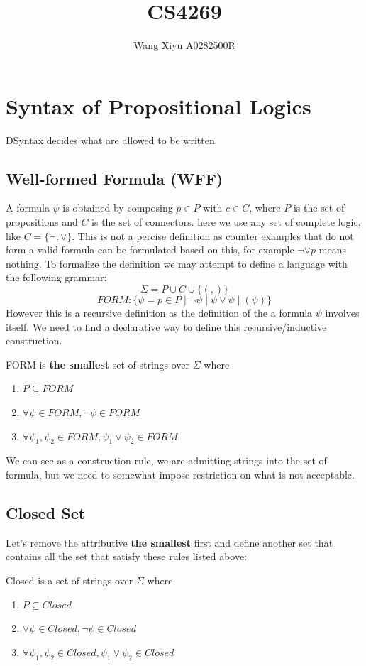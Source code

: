\documentclass{article}
\newtheorem{definition}[theorem]{Definition}
\let\olddefinition\definition
\let\endolddefinition\enddefinition
\renewenvironment{definition}
  {\begin{tcolorbox}[
      colback=red!10,
      colframe=red!50!black,
      boxrule=0.6pt,
      arc=2pt,
      left=6pt,right=6pt,top=4pt,bottom=4pt,
      breakable
    ]\olddefinition}
  {\endolddefinition\end{tcolorbox}}
\begin{document}
\title{CS4269}
\author{Wang Xiyu A0282500R}
\date{}
\maketitle

\tableofcontents

\newpage
\section{Syntax of Propositional Logics}
\begin{definition}
    DSyntax decides what are allowed to be written
\end{definition}
\subsection{Well-formed Formula (WFF)}
A formula $\psi$ is obtained by composing $p \in P$ with $c\in C$, where $P$ is the set of propositions and $C$ is the set of connectors. here we use
any set of complete logic, like $C = \{\neg, \lor\}$. This is not a percise definition as counter examples that do not form 
a valid formula can be formulated based on this, for example $\neg \lor p$ means nothing. To formalize the definition we may attempt to define a language with the following grammar:
\[\Sigma = P\cup C\cup \{(, )\}\]
\[FORM :\{\psi = p \in P \mid \neg \psi \mid \psi \lor \psi \mid (\psi) \}\]
However this is a recursive definition as the definition of the a formula $\psi$ involves itself. We need to find a declarative way to define this recursive/inductive construction. 
\begin{definition}
    FORM is \textbf{the smallest} set of strings over $\Sigma$ where 
    \begin{enumerate}
        \item $P \subseteq FORM$
        \item $\forall \psi \in FORM, \neg \psi \in FORM$
        \item $\forall \psi_1, \psi_2 \in FORM, \psi_1 \lor \psi_2 \in FORM$
    \end{enumerate}
\end{definition}
We can see as a construction rule, we are admitting strings into the set of formula, but we need to somewhat impose restriction on what is not acceptable. 
\subsection{Closed Set}
Let's remove the attributive \textbf{the smallest} first and define another set that contains all the set that satisfy these rules listed above:
\begin{definition}
    Closed is a set of strings over $\Sigma$ where 
    \begin{enumerate}
        \item $P \subseteq Closed $
        \item $\forall \psi \in Closed, \neg \psi \in Closed$
        \item $\forall \psi_1, \psi_2 \in Closed, \psi_1 \lor \psi_2 \in Closed$
    \end{enumerate}
\end{definition}
\end{document}
